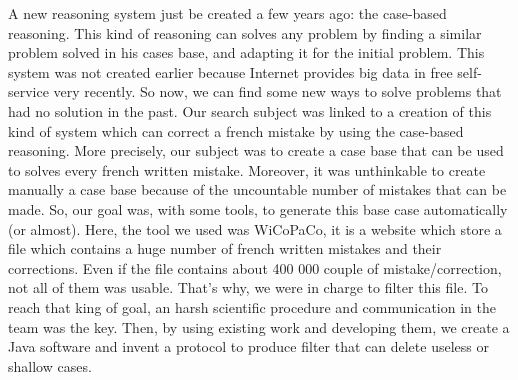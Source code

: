 \documentclass[11pt]{article}
\begin{document}
A new reasoning system just be created a few years ago: the case-based reasoning. This kind of reasoning can solves any problem by finding a similar problem solved in his cases base, and adapting it for the initial problem. This system was not created earlier because Internet provides big data in free self-service very recently. So now, we can find some new ways to solve problems that had no solution in the past. Our search subject was linked to a creation of this kind of system which can correct a french mistake by using the case-based reasoning. More precisely, our subject was to create a case base that can be used to solves every french written mistake. Moreover, it was unthinkable to create manually a case base because of the uncountable number of mistakes that can be made. So, our goal was, with some tools, to generate this base case automatically (or almost). Here, the tool we used was WiCoPaCo, it is a website which store a file which contains a huge number of french written mistakes and their corrections. Even if the file contains about 400 000 couple of mistake/correction, not all of them was usable. That's why, we were in charge to filter this file. To reach that king of goal, an harsh scientific procedure and communication in the team was the key. Then, by using existing work and developing them, we create a Java software and invent a protocol to produce filter that can delete useless or shallow cases.
\end{document}
